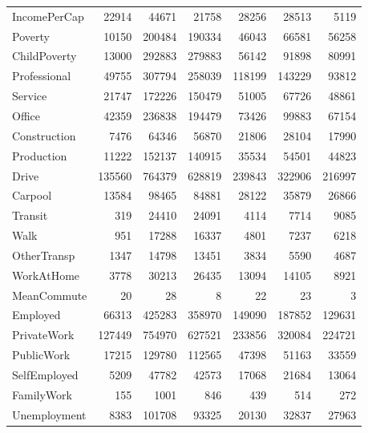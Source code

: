 \documentclass{article}
\begin{document}
\begin{table}
\begin{tabular}{l|rrrrrr}
		IncomePerCap & 22914 & 44671 & 21758 & 28256 & 28513 & 5119\\

		Poverty & 10150 & 200484 & 190334 & 46043 & 66581 & 56258\\

		ChildPoverty & 13000 & 292883 & 279883 & 56142 & 91898 & 80991\\

		Professional & 49755 & 307794 & 258039 & 118199 & 143229 & 93812\\

		Service & 21747 & 172226 & 150479 & 51005 & 67726 & 48861\\

		Office & 42359 & 236838 & 194479 & 73426 & 99883 & 67154\\

		Construction & 7476 & 64346 & 56870 & 21806 & 28104 & 17990\\

		Production & 11222 & 152137 & 140915 & 35534 & 54501 & 44823\\

		Drive & 135560 & 764379 & 628819 & 239843 & 322906 & 216997\\

		Carpool & 13584 & 98465 & 84881 & 28122 & 35879 & 26866\\

		Transit & 319 & 24410 & 24091 & 4114 & 7714 & 9085\\

		Walk & 951 & 17288 & 16337 & 4801 & 7237 & 6218\\

		OtherTransp & 1347 & 14798 & 13451 & 3834 & 5590 & 4687\\

		WorkAtHome & 3778 & 30213 & 26435 & 13094 & 14105 & 8921\\

		MeanCommute & 20 & 28 & 8 & 22 & 23 & 3\\

		Employed & 66313 & 425283 & 358970 & 149090 & 187852 & 129631\\

		PrivateWork & 127449 & 754970 & 627521 & 233856 & 320084 & 224721\\

		PublicWork & 17215 & 129780 & 112565 & 47398 & 51163 & 33559\\

		SelfEmployed & 5209 & 47782 & 42573 & 17068 & 21684 & 13064\\

		FamilyWork & 155 & 1001 & 846 & 439 & 514 & 272\\

		Unemployment & 8383 & 101708 & 93325 & 20130 & 32837 & 27963\\

	\end{tabular}
\end{table}
\end{document}
